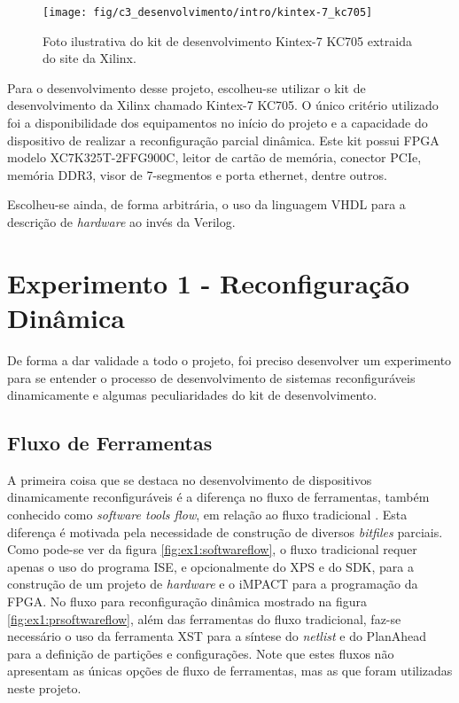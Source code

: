 \documentclass[11pt,a4paper,oneside]{book}
\begin{document}
\begin{figure}[h]
\centering
\texttt{[image: fig/c3\_desenvolvimento/intro/kintex-7\_kc705]}
\caption{Foto ilustrativa do kit de desenvolvimento Kintex-7 KC705 extraida do site da Xilinx.}
\label{fig:kc705}
\end{figure}

Para o desenvolvimento desse projeto, escolheu-se utilizar o kit de desenvolvimento da Xilinx\textregistered{} chamado Kintex-7 KC705.
O único critério utilizado foi a disponibilidade dos equipamentos no início do projeto e a capacidade do dispositivo de realizar a reconfiguração parcial dinâmica.
Este kit possui FPGA modelo XC7K325T-2FFG900C, leitor de cartão de memória, conector PCIe\textregistered{}, memória DDR3, visor de 7-segmentos e porta ethernet, dentre outros.

Escolheu-se ainda, de forma arbitrária, o uso da linguagem VHDL para a descrição de \textit{hardware} ao invés da Verilog.

\section{Experimento 1 - Reconfiguração Dinâmica}
De forma a dar validade a todo o projeto, foi preciso desenvolver um experimento para se entender o processo de desenvolvimento de sistemas reconfiguráveis dinamicamente e algumas peculiaridades do kit de desenvolvimento.

\subsection{Fluxo de Ferramentas}
A primeira coisa que se destaca no desenvolvimento de dispositivos dinamicamente reconfiguráveis é a diferença no fluxo de ferramentas, também conhecido como \textit{software tools flow}, em relação ao fluxo tradicional \cite{ug743}.
Esta diferença é motivada pela necessidade de construção de diversos \textit{bitfiles} parciais.
Como pode-se ver da figura \ref{fig:ex1:softwareflow}, o fluxo tradicional requer apenas o uso do programa ISE, e opcionalmente do XPS e do SDK, para a construção de um projeto de \textit{hardware} e o iMPACT para a programação da FPGA.
No fluxo para reconfiguração dinâmica mostrado na figura \ref{fig:ex1:prsoftwareflow}, além das ferramentas do fluxo tradicional, faz-se necessário o uso da ferramenta XST para a síntese do \textit{netlist} e do PlanAhead para a definição de partições e configurações.
Note que estes fluxos não apresentam as únicas opções de fluxo de ferramentas, mas as que foram utilizadas neste projeto.
\end{document}
